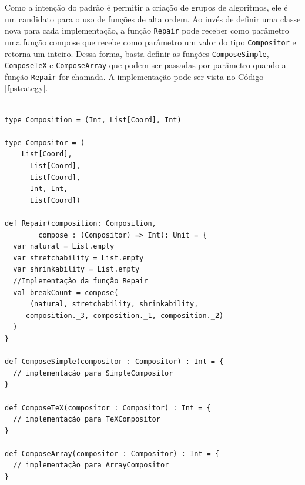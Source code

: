 Como a intenção do padrão é permitir a criação de 
grupos de algoritmos, ele é um candidato para o uso 
de funções de alta ordem. Ao invés de definir 
uma classe nova para cada implementação, a 
função \texttt{Repair} pode receber como parâmetro uma 
função compose que recebe como parâmetro um valor 
do tipo \texttt{Compositor} e retorna 
um inteiro. Dessa forma, basta definir as 
funções \texttt{ComposeSimple}, \texttt{ComposeTeX} e \texttt{ComposeArray} 
que podem ser passadas por parâmetro quando a 
função \texttt{Repair} for chamada. A implementação pode 
ser vista no Código \ref{fpstrategy}.

\begin{lstlisting}[caption={\textit{Strategy} Funcional.},label=fpstrategy]
    
type Composition = (Int, List[Coord], Int)

type Compositor = (
    List[Coord],
      List[Coord],
      List[Coord],
      Int, Int,
      List[Coord])

def Repair(composition: Composition,
        compose : (Compositor) => Int): Unit = {
  var natural = List.empty
  var stretchability = List.empty
  var shrinkability = List.empty
  //Implementação da função Repair
  val breakCount = compose(
      (natural, stretchability, shrinkability,
     composition._3, composition._1, composition._2)
  )
}

def ComposeSimple(compositor : Compositor) : Int = {
  // implementação para SimpleCompositor
}

def ComposeTeX(compositor : Compositor) : Int = {
  // implementação para TeXCompositor
}

def ComposeArray(compositor : Compositor) : Int = {
  // implementação para ArrayCompositor
}
    
\end{lstlisting}

